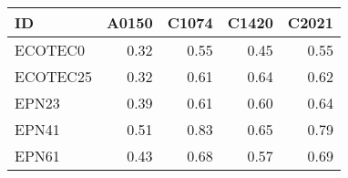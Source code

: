 \begin{tabular}{lrrrr}
\toprule
      ID &  A0150 &  C1074 &  C1420 &  C2021 \\
\midrule
 ECOTEC0 &   0.32 &   0.55 &   0.45 &   0.55 \\
ECOTEC25 &   0.32 &   0.61 &   0.64 &   0.62 \\
   EPN23 &   0.39 &   0.61 &   0.60 &   0.64 \\
   EPN41 &   0.51 &   0.83 &   0.65 &   0.79 \\
   EPN61 &   0.43 &   0.68 &   0.57 &   0.69 \\
\bottomrule
\end{tabular}
